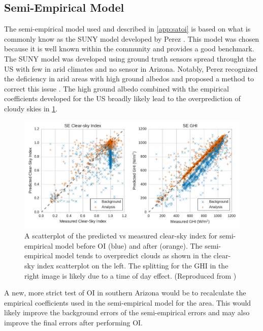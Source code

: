 \subsection{Semi-Empirical Model}
The semi-empirical model used and described in \cref{app:satoi} is
based on what is commonly know as the SUNY model developed by Perez
\etal \citep{Perez2002}.
This model was chosen because it is well known within the community
and provides a good benchmark.
The SUNY model was developed using ground truth sensors spread
throught the US with few in arid climates and no sensor in Arizona.
Notably, Perez \etal recognized the deficiency in arid areas with high
ground albedos and proposed a method to correct this issue
\citep{Perez2004}.
The high ground albedo combined with the empirical coefficients
developed for the US broadly likely lead to the overprediction of
cloudy skies in \cref{fig:suny_scatter}.

\begin{figure}[h]
\centering
\includegraphics[width=\textwidth]{figs/suny_scatter.pdf}
\caption[Scatterplot of predicted vs measured clear-sky index for the
semi-empirical model]{A scatterplot of the predicted vs measured
  clear-sky index for semi-empirical model before OI (blue) and after
  (orange). The semi-empirical model tends to overpredict clouds as
  shown in the clear-sky index scatterplot on the left. The splitting
  for the GHI in the right image is likely due to a time of day
  effect.  (Reproduced from \cite{Lorenzo2017})}
\label{fig:suny_scatter}
\end{figure}

A new, more strict test of OI in southern Arizona would be to
recalculate the empirical coefficients used in the semi-empirical
model for the area.
This would likely improve the background errors of the semi-empirical
errors and may also improve the final errors after performing OI.

